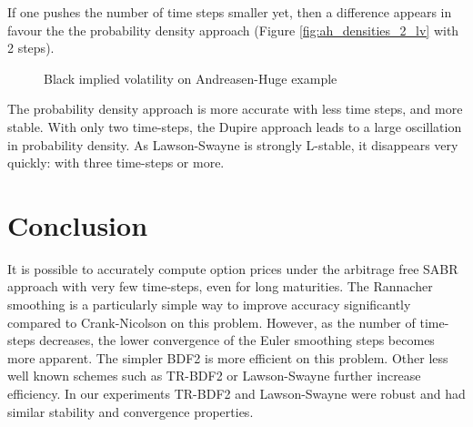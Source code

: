 \documentclass[]{rAMF2e}
\begin{document}
If one pushes the number of time steps smaller yet, then a difference appears in favour the the probability density approach (Figure \ref{fig:ah_densities_2_lv} with 2 steps).
\begin{figure}[htb]
  \begin{center}  
    \end{center}
     \caption{\label{fig:ah_impliedvols_lv} Black implied volatility on Andreasen-Huge example}
\end{figure}

The probability density approach is more accurate with less time steps, and more stable. With only two time-steps, the Dupire approach leads to a large oscillation in probability density. As Lawson-Swayne is strongly L-stable, it disappears very quickly: with three time-steps or more.


\section{Conclusion}
It is possible to accurately compute option prices under the arbitrage free SABR approach with very few time-steps, even for long maturities. The Rannacher smoothing is a particularly simple way to improve accuracy significantly compared to Crank-Nicolson on this problem. However, as the number of time-steps decreases, the lower convergence of the Euler smoothing steps becomes more apparent. The simpler BDF2 is more efficient on this problem. Other less well known schemes such as TR-BDF2 or Lawson-Swayne further increase efficiency. In our experiments TR-BDF2 and Lawson-Swayne were robust and had similar stability and convergence properties.
\end{document}
